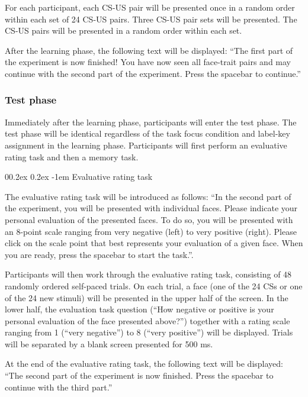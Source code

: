 \documentclass[
  doc,floatsintext]{apa6}
\makeatletter
\let\oldparagraph\paragraph
\renewcommand{\paragraph}{
    \@ifstar
      \xxxParagraphStar
      \xxxParagraphNoStar
  }
\newcommand{\xxxParagraphStar}[1]{\oldparagraph*{#1}\mbox{}}
\newcommand{\xxxParagraphNoStar}[1]{\oldparagraph{#1}\mbox{}}
\renewcommand{\paragraph}{\@startsection{paragraph}{4}{\parindent}%
  {0\baselineskip \@plus 0.2ex \@minus 0.2ex}%
  {-1em}%
  {\normalfont\normalsize\bfseries\itshape\typesectitle}}
\makeatother
\begin{document}
For each participant, each CS-US pair will be presented once in a random order within each set of 24 CS-US pairs. Three CS-US pair sets will be presented. The CS-US pairs will be presented in a random order within each set.

After the learning phase, the following text will be displayed:
``The first part of the experiment is now finished!
You have now seen all face-trait pairs and may continue with the second part of the experiment.
Press the spacebar to continue.''

\subsubsection{Test phase}\label{test-phase}

Immediately after the learning phase, participants will enter the test phase. The test phase will be identical regardless of the task focus condition and label-key assignment in the learning phase. Participants will first perform an evaluative rating task and then a memory task.

\paragraph{Evaluative rating task}\label{evaluative-rating-task}

The evaluative rating task will be introduced as follows:
``In the second part of the experiment, you will be presented with individual faces.
Please indicate your personal evaluation of the presented faces.
To do so, you will be presented with an 8-point scale ranging from very negative (left) to very positive (right).
Please click on the scale point that best represents your evaluation of a given face.
When you are ready, press the spacebar to start the task.''.

Participants will then work through the evaluative rating task, consisting of 48 randomly ordered self-paced trials. On each trial, a face (one of the 24 CSs or one of the 24 new stimuli) will be presented in the upper half of the screen. In the lower half, the evaluation task question (``How negative or positive is your personal evaluation of the face presented above?'') together with a rating scale ranging from 1 (``very negative'') to 8 (``very positive'') will be displayed.
Trials will be separated by a blank screen presented for 500 ms.

At the end of the evaluative rating task, the following text will be displayed:
``The second part of the experiment is now finished.
Press the spacebar to continue with the third part.''
\end{document}
